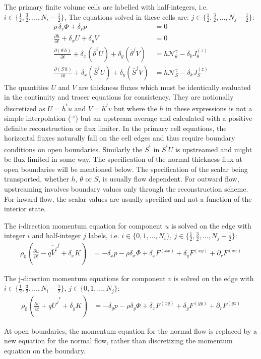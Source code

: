 \documentclass[11pt]{article}
\begin{document}
The primary finite volume cells are labelled with half-integers, i.e. $i \in \{\frac{1}{2},\frac{3}{2},\ldots,N_i-\frac{1}{2}\}$, The equations solved in these cells are:
$j \in \{\frac{1}{2},\frac{3}{2},\ldots,N_j-\frac{1}{2}\}$:
\begin{align}
\rho \, \delta_r \Phi + \delta_r p &= 0
\\
\frac{\partial h}{\partial t} + \delta_x U + \delta_y V &= 0
\\
\frac{\partial ( \theta \, h )}{\partial t} + \delta_x \left( \overline{\theta}^i U \right) + \delta_y \left( \overline{\theta}^j V \right) &=  h \boldsymbol{\mathcal{N}}_\theta^\gamma - \delta_k J_\theta^{(z)}
\\
\frac{\partial ( S \, h )}{\partial t} + \delta_x \left( \overline{S}^i U \right) + \delta_y \left( \overline{S}^j V \right) &= h \boldsymbol{\mathcal{N}}_S^\gamma - \delta_k J_S^{(z)}
\end{align}
The quantities $U$ and $V$ are thickness fluxes which must be identically evaluated in the continuity and tracer equations for consistency. They are notionally discretized as $U=\overline{h}^iu$ and $V=\overline{h}^jv$ but where the $h$ in these expressions is not a simple interpolation ($^{\overline{\,\,\,}i}$) but an upstream average and calculated with a positive definite reconstruction or flux limiter. In the primary cell equations, the horizontal fluxes naturally fall on the cell edges and thus require boundary conditions on open boundaries. Similarly the $\overline{S}^i$ in $\overline{S}^iU$ is upstreamed and might be flux limited in some way. The specification of the normal thickness flux at open boundaries will be mentioned below. The specification of the scalar being transported, whether $h$, $\theta$ or $S$, is usually flow dependent. For outward flow, upstreaming involves boundary values only through the reconstruction scheme. For inward flow, the scalar values are usually specified and not a function of the interior state.

The i-direction momentum equation for component $u$ is solved on the edge with integer $i$ and half-integer $j$ labels, i.e. $i \in \{0,1,\ldots,N_i\}$, $j \in \{\frac{1}{2},\frac{3}{2},\ldots,N_j-\frac{1}{2}\}$:
\begin{align}
\rho_0 \left( \frac{\partial u}{\partial t}
- \overline{ q \overline{V}^i }^j + \delta_x K \right)
&= - \delta_x p - \rho \delta_x \Phi
+ \delta_x {F}^{(xx)}  + \delta_y {F}^{(xy)} + \partial_r {F}^{(xz)}
\end{align}

The j-direction momentum equations for component $v$ is solved on the edge with $i \in \{\frac{1}{2},\frac{3}{2},\ldots,N_i-\frac{1}{2}\}$, $j \in \{0,1,\ldots,N_j\}$:
\begin{align}
\rho_0 \left( \frac{\partial v}{\partial t}
+ \overline{ q \overline{U}^j }^i + \delta_y K \right)
&= -\delta_y p - \rho \delta_y \Phi
+ \delta_x {F}^{(xy)}  + \delta_y {F}^{(yy)} + \partial_r {F}^{(yz)}
\end{align}

At open boundaries, the momentum equation for the normal flow is replaced by a new equation for the normal flow, rather than discretizing the momentum equation on the boundary.


\end{document}
